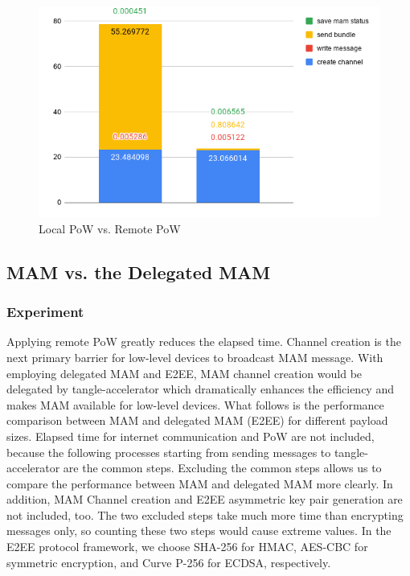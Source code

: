 \begin{spacing}{2.0}
\begin{figure}[H]
    \centering
    \includegraphics[width=5in]{img/rpi3_pow}
    \caption{Local PoW vs. Remote PoW}
    \label{fig:rpi3_pow}
\end{figure}

\subsection{MAM vs. the Delegated MAM}
\label{section:smart_contract_evaluation}

\subsubsection{Experiment}
Applying remote PoW greatly reduces the elapsed time. Channel creation is the next primary barrier for low-level devices to broadcast MAM message. With employing delegated MAM and E2EE, MAM channel creation would be delegated by tangle-accelerator which dramatically enhances the efficiency and makes MAM available for low-level devices. What follows is the performance comparison between MAM and delegated MAM (E2EE) for different payload sizes. Elapsed time for internet communication and PoW are not included, because the following processes starting from sending messages to tangle-accelerator are the common steps. Excluding the common steps allows us to compare the performance between MAM and delegated MAM more clearly. In addition, MAM Channel creation and E2EE asymmetric key pair generation are not included, too. The two excluded steps take much more time than encrypting messages only, so counting these two steps would cause extreme values. In the E2EE protocol framework, we choose SHA-256 for HMAC, AES-CBC for symmetric encryption, and Curve P-256 for ECDSA, respectively.


\end{spacing}
